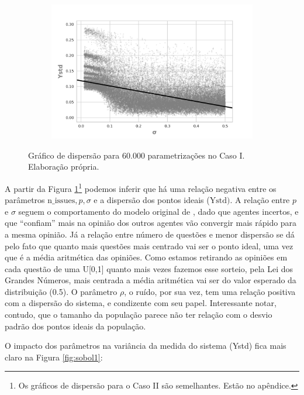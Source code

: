 \begin{figure}[H]
                \begin{subfigure}[b]{0.49\textwidth}
            \includegraphics[width=\textwidth]{ims/mutoregressions/regressionmutatingosigma.png}
    \end{subfigure}
    \caption{Gráfico de dispersão para 60.000 parametrizações no Caso I.
      Elaboração própria.}\label{fig:scatter1}
\end{figure}


A partir da Figura \ref{fig:scatter1}\footnote{Os gráficos de dispersão para o
  Caso II são semelhantes. Estão no apêndice.} podemos inferir que há uma relação
negativa entre os parâmetros \(\text{n\_issues}, p, \sigma \) e a dispersão dos
pontos ideais (\( \text{Ystd}) \). A relação entre \(p\) e \(\sigma\) seguem o
comportamento do modelo original de , dado que
agentes incertos, e que ``confiam'' mais na opinião dos outros agentes vão
convergir mais rápido para a mesma opinião. Já a relação entre número de
questões e menor dispersão se dá pelo fato que quanto mais questões mais
centrado vai ser o ponto ideal, uma vez que é a média aritmética das opiniões.
Como estamos retirando as opiniões em cada questão de uma U[0,1] quanto mais
vezes fazemos esse sorteio, pela Lei dos Grandes Números, mais centrada a média
aritmética vai ser do valor esperado da distribuição (0.5). O parâmetro \(\rho\), o
ruído, por sua vez, tem uma relação positiva com a dispersão do sistema, e
condizente com seu papel. Interessante notar, contudo, que o tamanho da
população parece não ter relação com o desvio padrão dos pontos ideais da
população.

O impacto dos parâmetros na variância da medida do sistema (Ystd) fica mais
claro na Figura \ref{fig:sobol1}: 

